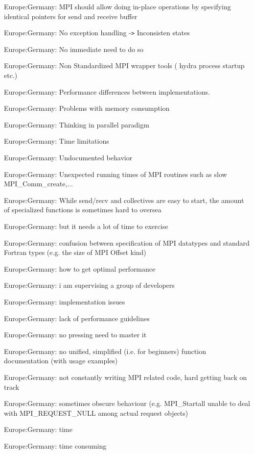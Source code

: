 \item Europe:Germany: MPI should allow doing in-place operations by specifying identical pointers for send and receive buffer
\item Europe:Germany: No exception handling -\verb!>! Inconsisten states
\item Europe:Germany: No immediate need to do so
\item Europe:Germany: Non  Standardized MPI wrapper tools ( hydra process startup etc.)
\item Europe:Germany: Performance differences between implementations.
\item Europe:Germany: Problems with memory consumption
\item Europe:Germany: Thinking in parallel paradigm
\item Europe:Germany: Time limitations
\item Europe:Germany: Undocumented behavior
\item Europe:Germany: Unexpected running times of MPI routines such as slow MPI\_Comm\_create,...
\item Europe:Germany: While send/recv and collectives are easy to start, the amount of specialized functions is sometimes hard to oversea
\item Europe:Germany: but it needs a lot of time to exercise
\item Europe:Germany: confusion between specification of MPI datatypes and standard Fortran types (e.g. the size of MPI Offset kind)
\item Europe:Germany: how to get optimal performance
\item Europe:Germany: i am supervising a group of developers
\item Europe:Germany: implementation issues
\item Europe:Germany: lack of performance guidelines
\item Europe:Germany: no pressing need to master it
\item Europe:Germany: no unified, simplified (i.e. for beginners) function documentation (with usage examples)
\item Europe:Germany: not constantly writing MPI related code, hard getting back on track
\item Europe:Germany: sometimes obscure behaviour (e.g. MPI\_Startall unable to deal with MPI\_REQUEST\_NULL among actual request objects)
\item Europe:Germany: time
\item Europe:Germany: time consuming
